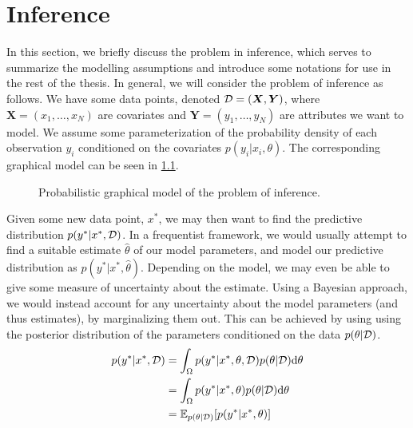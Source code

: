 \chapter{Inference}

In this section, we briefly discuss the problem in inference, which serves to summarize the modelling assumptions and introduce some notations for use in the rest of the thesis. 
In general, we will consider the problem of inference as follows.
We have some data points, denoted $\mathcal{D} = (\bm{X}, \bm{Y})$, where $\bm{X} = (x_1,\dots,x_N)$ are covariates and $\bm{Y} = (y_1, \dots, y_N)$ are attributes we want to model. 
We assume some parameterization of the probability density of each observation $y_i$ conditioned on the covariates $p(y_i|x_i,\theta)$.
The corresponding graphical model can be seen in \cref{fig:pgm}. 
\begin{figure}[htbp]
    \centering
    \caption{Probabilistic graphical model of the problem of inference.}
    \label{fig:pgm}
\end{figure}
Given some new data point, $x^\ast$, we may then want to find the predictive distribution $p(y^\ast | x^\ast, \mathcal{D})$. 
In a frequentist framework, we would usually attempt to find a suitable estimate $\hat{\theta}$ of our model parameters, and model our predictive distribution as $p(y^\ast | x^\ast, \hat{\theta})$.
Depending on the model, we may even be able to give some measure of uncertainty about the estimate.
Using a Bayesian approach, we would instead account for any uncertainty about the model parameters (and thus estimates), by marginalizing them out. 
This can be achieved by using using the posterior distribution of the parameters conditioned on the data $p(\theta|\mathcal{D})$.
\begin{equation}\label{eq:inference}
    \begin{aligned}
        p(y^\ast | x^\ast, \mathcal{D}) &= \int_{\Omega} p(y^\ast | x^\ast, \theta, \mathcal{D})  p(\theta|\mathcal{D}) \dd\theta \\
        &= \int_{\Omega} p(y^\ast | x^\ast, \theta)  p(\theta|\mathcal{D}) \dd\theta\\
        &= \operatorname{\mathbb{E}}_{p(\theta|\mathcal{D})} [p(y^\ast | x^\ast, \theta)] 
    \end{aligned}
\end{equation}
